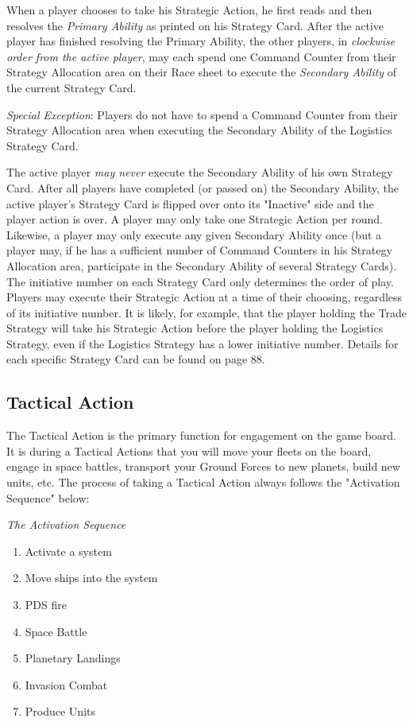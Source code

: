 \documentclass[11pt,fleqn]{book} %
\begin{document}
When a player chooses to take his Strategic Action, he first reads and then resolves the \emph{Primary Ability} as printed on his Strategy Card. After the active player has finished resolving the Primary Ability, the other players, in \emph{clockwise order from the active player}, may each spend one Command Counter from their Strategy Allocation area on their Race sheet to execute the \emph{Secondary Ability} of the current Strategy Card.

\begin{STbox}
    \emph{Special Exception}: Players do not have to spend a Command Counter from their Strategy Allocation area when executing the Secondary Ability of the Logistics Strategy Card.
\end{STbox}

The active player \emph{may never} execute the Secondary Ability of his own Strategy Card.
After all players have completed (or passed on) the Secondary Ability, the active player's Strategy Card is flipped over onto its "Inactive" side and the player action is over.
A player may only take one Strategic Action per round. Likewise, a player may only execute any given Secondary Ability once (but a player may, if he has a sufficient number of Command Counters in his Strategy Allocation area, participate in the Secondary Ability of several Strategy Cards).
The initiative number on each Strategy Card only determines the order of play. Players may execute
their Strategic Action at a time of their choosing, regardless of its initiative number.  It is likely, for example, that the player holding the Trade Strategy will take his Strategic Action before the player holding the Logistics Strategy, even if the Logistics Strategy has a lower initiative number. Details for each specific Strategy Card can be found on page 88.  

\subsection{Tactical Action} %
\label{sub:tactical_action}

The Tactical Action is the primary function for engagement on the game board. It is during a Tactical
Actions that you will move your fleets on the board, engage in space battles, transport your Ground Forces to new planets, build new units, etc. 
The process of taking a Tactical Action always follows the "Activation Sequence" below:


\emph{The Activation Sequence}
\begin{enumerate}
\item Activate a system
\item Move ships into the system
\item PDS fire
\item Space Battle
\item Planetary Landings
\item Invasion Combat
\item Produce Units
\end{enumerate}
\end{document}
